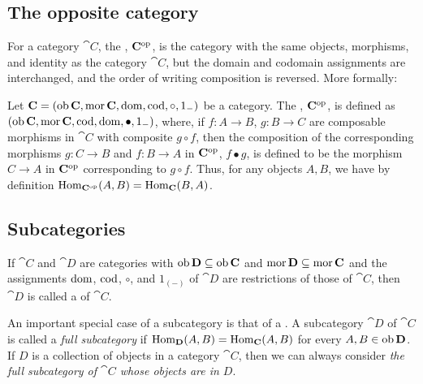 \subsection*{The opposite category}
For a category $\cat{C}$, the , $\mathbf{C}^{\mathrm{op}}$, is the category with the same objects, morphisms, and identity as the category $\cat{C}$, but the domain and codomain assignments are interchanged, and the order of writing composition is reversed. More formally:
\begin{definition}
Let $\mathbf{C} = (\operatorname{\mathrm{ob}} \mathbf{C}, \operatorname{\mathrm{mor}} \mathbf{C}, \operatorname{\mathrm{dom}}, \operatorname{\mathrm{cod}}, \circ, 1_{-})$ be a
category. The , $\mathbf{C}^{\mathrm{op}}$, is defined as $(\operatorname{\mathrm{ob}}
\mathbf{C}, \operatorname{\mathrm{mor}} \mathbf{C}, \operatorname{\mathrm{cod}}, \operatorname{\mathrm{dom}}, \bullet, 1_{-})$, where, if $f \colon A \to
B$, $g \colon B \to C$ are composable morphisms in $\cat{C}$ with composite $g
\circ f$, then the composition of the corresponding morphisms $g \colon C \to B$
and $f \colon B \to A$ in $\mathbf{C}^{\mathrm{op}}$, $f \bullet g$, is defined to be the
morphism $C \to A$ in $\mathbf{C}^{\mathrm{op}}$ corresponding to $g \circ f$. Thus, for any
objects $A, B$, we have by definition $\mathrm{Hom}_{\mathbf{C}^{\mathrm{op}}}(A,B) = \mathrm{Hom}_{\mathbf{C}}(B,A)$.
\end{definition}

\subsection*{Subcategories}
If $\cat{C}$ and $\cat{D}$ are categories with $\operatorname{\mathrm{ob}} \mathbf{D} \subseteq \operatorname{\mathrm{ob}} \mathbf{C}$ and $\operatorname{\mathrm{mor}} \mathbf{D} \subseteq \operatorname{\mathrm{mor}} \mathbf{C}$ and the assignments $\operatorname{\mathrm{dom}}$, $\operatorname{\mathrm{cod}}$, $\circ$, and $1_{(-)}$ of $\cat{D}$ are restrictions of those of $\cat{C}$, then $\cat{D}$ is called a  of $\cat{C}$.

An important special case of a subcategory is that of a . A subcategory $\cat{D}$ of $\cat{C}$ is called a \emph{full subcategory} if $\mathrm{Hom}_{\mathbf{D}}(A,B) = \mathrm{Hom}_{\mathbf{C}}(A,B)$ for every $A, B \in \operatorname{\mathrm{ob}} \mathbf{D}$. If $D$ is a collection of objects in a category $\cat{C}$, then we can always consider \emph{the full subcategory of $\cat{C}$ whose objects are in $D$}. 


